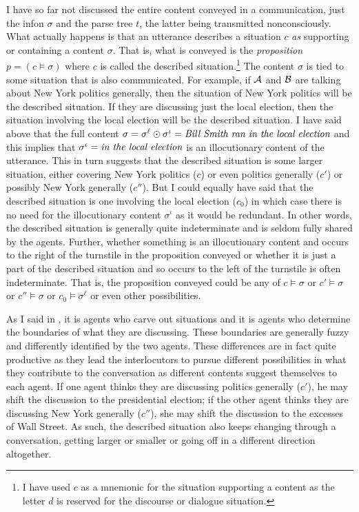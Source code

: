 I have so far not discussed the entire content conveyed in a communication, just the infon $\sigma$ and the parse tree $t$, the latter being transmitted nonconsciously. What actually happens is that an utterance describes a situation $c$ \emph{as} supporting or containing a content $\sigma$. That is, what is conveyed is the \emph{proposition} $p = (c \vDash \sigma)$ where $c$ is called the described situation.\footnote{I have used $c$ as a mnemonic for the situation supporting a content as the letter $d$ is reserved for the discourse or dialogue situation.} The content $\sigma$ is tied to some situation that is also communicated. For example, if $\cal A$ and $\cal B$ are talking about New York politics generally, then the situation of New York politics will be the described situation. If they are discussing just the local election, then the situation involving the local election will be the described situation. I have said above that the full content $\sigma = \sigma^{\ell} \odot \sigma^{\iota} = \emph{Bill Smith ran in the local election}$ and this implies that $\sigma^{\iota} = \emph{in the local election}$ is an illocutionary content of the utterance. This in turn suggests that the described situation is some larger situation, either covering New York politics ($c$) or even politics generally ($c'$) or possibly New York generally ($c''$). But I could equally have said that the described situation is one involving the local election ($c_0$) in which case there is no need for the illocutionary content $\sigma^{\iota}$ as it would be redundant. In other words, the described situation is generally quite indeterminate and is seldom fully shared by the agents. Further, whether something is an illocutionary content and occurs to the right of the turnstile in the proposition conveyed or whether it is just a part of the described situation and so occurs to the left of the turnstile is often indeterminate. That is, the proposition conveyed could be any of $c \vDash \sigma$ or $c' \vDash \sigma$ or $c'' \vDash \sigma$ or $c_0 \vDash \sigma^{\ell}$ or even other possibilities.

As I said in , it is agents who carve out situations and it is agents who determine the boundaries of what they are discussing. These boundaries are generally fuzzy and differently identified by the two agents. These differences are in fact quite productive as they lead the interlocutors to pursue different possibilities in what they contribute to the conversation as different contents suggest themselves to each agent. If one agent thinks they are discussing politics generally ($c'$), he may shift the discussion to the presidential election; if the other agent thinks they are discussing New York generally ($c''$), she may shift the discussion to the excesses of Wall Street. As such, the described situation also keeps changing through a conversation, getting larger or smaller or going off in a different direction altogether.

